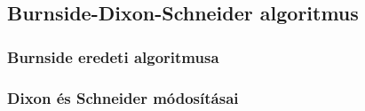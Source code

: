 \subsection{Burnside-Dixon-Schneider algoritmus}
\label{subsec:bds}
\subsubsection{Burnside eredeti algoritmusa}
\subsubsection{Dixon és Schneider módosításai}

